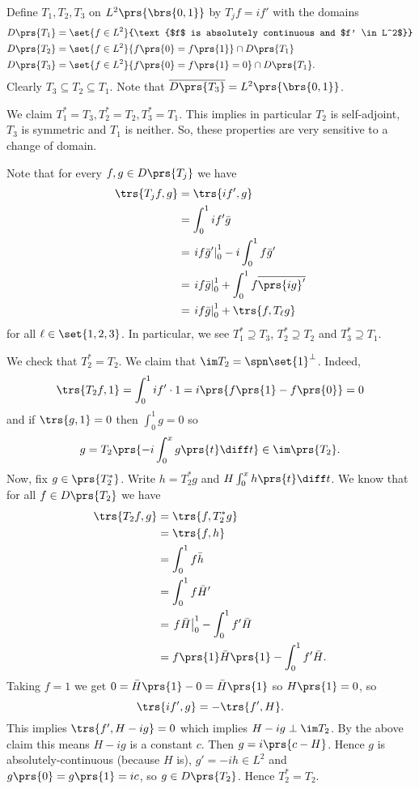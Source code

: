 \documentclass[10pt, twoside]{book}
\begin{document}
\begin{example}\label{example:unbounded_main_example}
Define $T_1, T_2, T_3$ on $L^2\prs{\brs{0,1}}$ by $T_j f = i f'$ with the domains
\begin{align*}
D\prs{T_1} &= \set{f \in L^2}{\text{$f$ is absolutely continuous and $f' \in L^2$}} \\
D\prs{T_2} &= \set{f \in L^2}{f\prs{0} = f\prs{1}} \cap D\prs{T_1} \\
D\prs{T_3} &= \set{f \in L^2}{f\prs{0} = f\prs{1} = 0} \cap D\prs{T_1} \text{.}
\end{align*}
Clearly $T_3 \subseteq T_2 \subseteq T_1$.
Note that $\overline{D\prs{T_3}} = L^2\prs{\brs{0,1}}$.

We claim $T_1^* = T_3, T_2^* = T_2, T_3^* = T_1$. This implies in particular $T_2$ is self-adjoint, $T_3$ is symmetric and $T_1$ is neither.
So, these properties are very sensitive to a change of domain.

Note that for every $f,g \in D\prs{T_j}$ we have
\begin{align*}
\trs{T_j f,g} &= \trs{if', g}
\\&= \int_0^1 if' \bar{g}
\\&= \left. if\bar{g}' \right|_{0}^{1} - i\int_0^1 f \bar{g}'
\\&= \left. if\bar{g} \right|_0^1 + \int_0^1 f\overline{\prs{ig}'}
\\&= \left. if\bar{g} \right|_0^1 + \trs{f, T_\ell g}
\end{align*}
for all $\ell \in \set{1,2,3}$.
In particular, we see $T_1^* \supseteq T_3$, $T_2^* \supseteq T_2$ and $T_3^* \supseteq T_1$.

We check that $T_2^* = T_2$. We claim that $\im T_2 = \spn\set{1}^\perp$. Indeed,
\begin{align*}
\trs{T_2 f, 1} = \int_0^1 if' \cdot 1 = i\prs{f\prs{1} - f\prs{0}} = 0
\end{align*}
and if $\trs{g,1} = 0$ then $\int_0^1 g = 0$ so \[g = T_2\prs{-i \int_0^x g\prs{t} \diff t} \in \im\prs{T_2}\text{.}\]
Now, fix $g \in \prs{T_2^*}$. Write $h = T_2^* g$ and $H \int_0^x h\prs{t} \diff t$. We know that for all $f \in D\prs{T_2}$ we have
\begin{align*}
\trs{T_2 f, g} &= \trs{f, T_2^* g}
\\&= \trs{f,h}
\\&= \int_0^1 f \bar{h}
\\&= \int_0^1 f \bar{H}'
\\&= \left. f \bar{H} \right|_0^1 - \int_0^1 f' \bar{H}
\\&= f\prs{1} \bar{H}\prs{1} - \int_0^1 f' \bar{H} \text{.}
\end{align*}
Taking $f = 1$ we get $0 = \bar{H}\prs{1} - 0 = \bar{H}\prs{1}$ so $H\prs{1} = 0$, so
\[\trs{if', g} = -\trs{f', {H}} \text{.}\]
This implies $\trs{f', H-ig} = 0$ which implies $H - ig \perp \im T_2$. By the above claim this means $H - ig$ is a constant $c$. Then $g = i \prs{c - H}$. Hence $g$ is absolutely-continuous (because $H$ is), $g' = -ih \in L^2$ and $g\prs{0} = g\prs{1} = ic$, so $g \in D\prs{T_2}$. Hence $T_2^* = T_2$.
\end{example}
\end{document}
